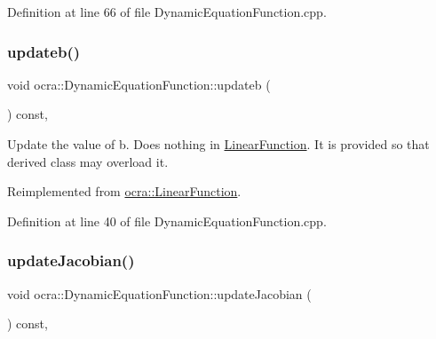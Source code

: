Definition at line 66 of file Dynamic\+Equation\+Function.\+cpp.

\hypertarget{classocra_1_1DynamicEquationFunction_ae1fe835a481f5f0bde6c8b0fa8ea09b2}{}\label{classocra_1_1DynamicEquationFunction_ae1fe835a481f5f0bde6c8b0fa8ea09b2} 
\subsubsection{\texorpdfstring{updateb()}{updateb()}}
{\footnotesize\ttfamily void ocra\+::\+Dynamic\+Equation\+Function\+::updateb (\begin{DoxyParamCaption}{ }\end{DoxyParamCaption}) const\hspace{0.3cm}{\ttfamily [protected]}, {\ttfamily [virtual]}}

Update the value of b. Does nothing in \hyperlink{classocra_1_1LinearFunction}{Linear\+Function}. It is provided so that derived class may overload it. 

Reimplemented from \hyperlink{classocra_1_1LinearFunction_a546454cd8d0909f99433ffc0e700c9e3}{ocra\+::\+Linear\+Function}.



Definition at line 40 of file Dynamic\+Equation\+Function.\+cpp.

\hypertarget{classocra_1_1DynamicEquationFunction_a81d71c87d0f52b3d321614c6219022ad}{}\label{classocra_1_1DynamicEquationFunction_a81d71c87d0f52b3d321614c6219022ad} 
\subsubsection{\texorpdfstring{update\+Jacobian()}{updateJacobian()}}
{\footnotesize\ttfamily void ocra\+::\+Dynamic\+Equation\+Function\+::update\+Jacobian (\begin{DoxyParamCaption}{ }\end{DoxyParamCaption}) const\hspace{0.3cm}{\ttfamily [protected]}, {\ttfamily [virtual]}}



